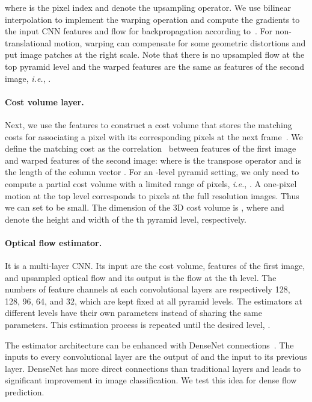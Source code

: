\documentclass[10pt,journal,cspaper,compsoc]{IEEEtran}
\def\ie{\emph{i.e.}\xspace} \def\Ie{\emph{I.e.}\xspace}
\newcommand{\beforePara}{\vspace{-0em}}
\newcommand{\beforeEqn}{\vspace{-0em}}
\begin{document}
where  is the pixel index and  denote the  upsampling operator. We use bilinear interpolation to implement the warping operation and compute the gradients to the input CNN features and flow for backpropagation according to~\cite{Ilg:2016:Flownet2,Jaderberg:2015:Spatial}. For non-translational motion, warping can compensate for some geometric distortions and put image patches at the right scale.  Note that there is no upsampled flow at the top pyramid level and the warped features are the same as features of the second image, \ie, 	. 
	
	\beforePara
	\paragraph{Cost volume layer.} 
	Next, we use the features to construct a cost volume that stores the matching costs for associating a pixel with its corresponding pixels at the next frame~\cite{Hosni2013Fast}. We define the matching cost as the correlation~\cite{Dosovitskiy:2015Flownet,Xu2017Accurate} between features of the first image and warped features of the second image: 
	\beforeEqn
	 where  is the transpose operator and  is the length of the column vector . 
	For an -level pyramid setting, we only need to compute a partial cost volume with a limited range of  pixels, \ie, . 
	A one-pixel motion at the top level corresponds to  pixels at the full resolution images. Thus we can set  to be small.  The dimension of the 3D cost volume is , where  and  denote the height and width of the th pyramid level, respectively.
	

	\beforePara
	\paragraph{Optical flow estimator.} 
	It is a multi-layer CNN. Its input are the cost volume, features of the first image, and upsampled optical flow and its output is the flow  at the th level. The numbers of feature channels at each convolutional layers are respectively 128, 128, 96, 64, and 32, which are kept fixed at all pyramid levels. The estimators at different levels have their own parameters instead of sharing the same parameters. This estimation process is repeated until the desired level, . 
	
	
	The estimator architecture can be enhanced with DenseNet connections~\cite{huang2016densely}. The inputs to every convolutional layer are the output of and the input to its previous layer. DenseNet has more direct connections than traditional layers and leads to significant improvement in image classification. We test this idea for dense flow prediction.
\end{document}
